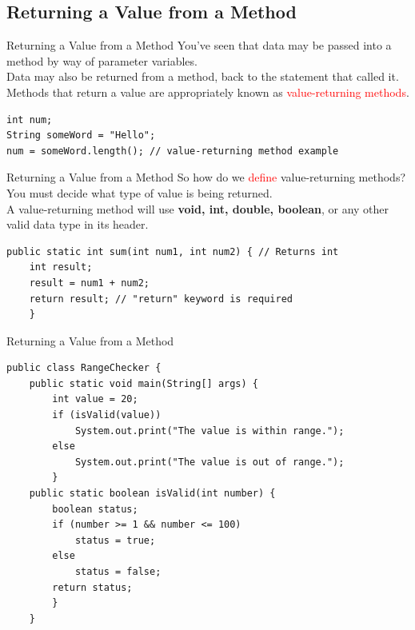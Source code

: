 \documentclass[11pt]{beamer}
\newcommand{\red}[1]{\textcolor{red}{#1}}
\begin{document}
\subsection{Returning a Value from a Method}
\begin{frame}[fragile]{Returning a Value from a Method}
    You've seen that data may be passed into a method by way of parameter variables. \\ 
    \vspace{1em}
    Data may also be returned from a method, back to the statement that called it. \\ 
    \vspace{1em}
    Methods that return a value are appropriately known as \red{value-returning methods}.
    \begin{lstlisting}
int num;
String someWord = "Hello";
num = someWord.length(); // value-returning method example
    \end{lstlisting}
\end{frame}

\begin{frame}[fragile]{Returning a Value from a Method}
    So how do we \red{define} value-returning methods? \\
    \vspace{1em}
    You must decide what type of value is being returned. \\ 
    \vspace{1em}
    A value-returning method will use \textbf{void, int, double, boolean}, or any other valid data type in its header.
    \begin{lstlisting}
public static int sum(int num1, int num2) { // Returns int
    int result;
    result = num1 + num2;
    return result; // "return" keyword is required
    }
    \end{lstlisting}
\end{frame}

\begin{frame}[fragile]{Returning a Value from a Method}
\begin{lstlisting}[basicstyle=\ttfamily\footnotesize]
public class RangeChecker {
    public static void main(String[] args) {
		int value = 20;
		if (isValid(value))
			System.out.print("The value is within range.");
		else
			System.out.print("The value is out of range.");
		}
	public static boolean isValid(int number) {
		boolean status;
		if (number >= 1 && number <= 100)
			status = true;
		else
			status = false;
		return status;
		}
	}
\end{lstlisting}    
\end{frame}
\end{document}
